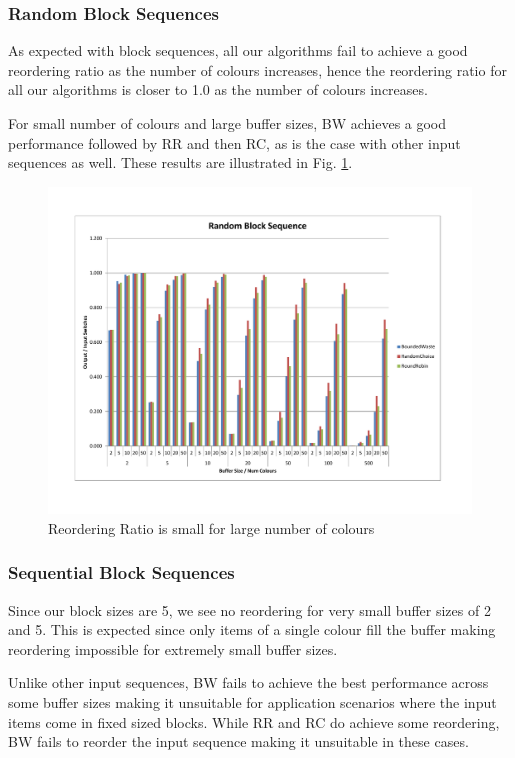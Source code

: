 \subsubsection{Random Block Sequences}

As expected with block sequences, all our algorithms fail to achieve a good reordering ratio as the number of colours increases, hence the reordering ratio for all our algorithms is closer to 1.0 as the number of colours increases. 

For small number of colours and large buffer sizes, BW achieves a good performance followed by RR and then RC, as is the case with other input sequences as well. These results are illustrated in Fig. \ref{randomBlockUniform}. 

\begin{figure}[ht]
\centering 
\includegraphics[scale=0.60]{Random-Block-Uniform.pdf}
\caption{Reordering Ratio is small for large number of colours}
\label{randomBlockUniform}
\end{figure}

\subsubsection{Sequential Block Sequences}

Since our block sizes are 5, we see no reordering for very small buffer sizes of 2 and 5. This is expected since only items of a single colour fill the buffer making reordering impossible for extremely small buffer sizes. 

Unlike other input sequences, BW fails to achieve the best performance across some buffer sizes making it unsuitable for application scenarios where the input items come in fixed sized blocks. While RR and RC do achieve some reordering, BW fails to reorder the input sequence making it unsuitable in these cases. 

